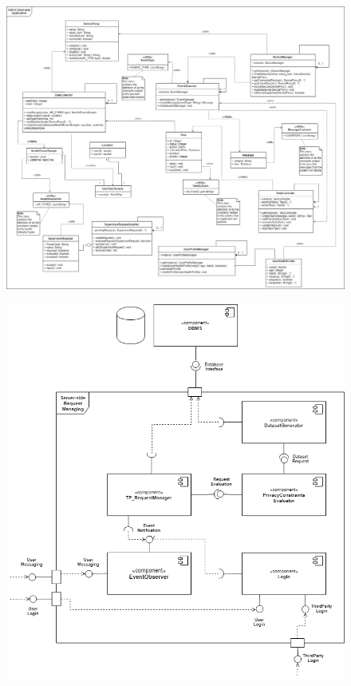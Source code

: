 \begin{flushleft}
\begin{figure}[H]
	\centering
	\includegraphics[scale=0.33]{images/uml/ASOS_client_class}
	\caption{}
\end{figure}

\begin{figure}[H]
	\centering
	\includegraphics[scale=0.5]{images/uml/D4H_server_requestManaging_component}
	\caption{}
\end{figure}



\end{flushleft}
